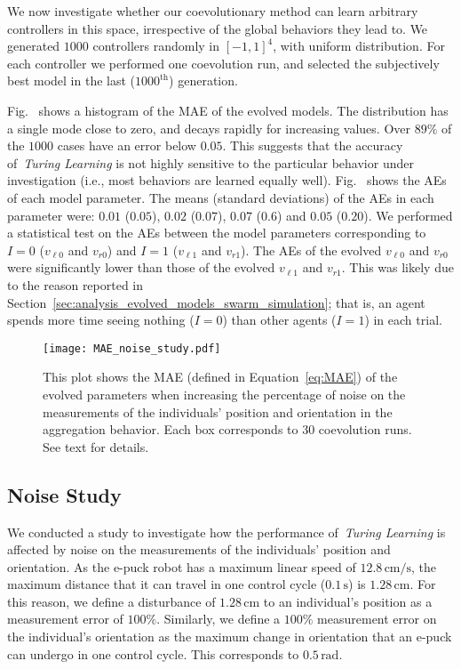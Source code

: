 We now investigate whether our coevolutionary method can learn arbitrary controllers in this space, irrespective of the global behaviors they lead to. We generated $1000$ controllers randomly in $[-1,1]^4$, with uniform distribution. For each controller we performed one coevolution run, and selected the subjectively best model in the last ($1000^\textrm{th}$) generation. 

Fig.~ shows a histogram of the MAE of the evolved models. The distribution has a single mode close to zero, and decays rapidly for increasing values. Over $89\%$ of the $1000$ cases have an error below $0.05$. This suggests that the accuracy of~\textit{Turing Learning} is not highly sensitive to the particular behavior under investigation (i.e., most behaviors are learned equally well). Fig.~ shows the AEs of each model parameter. The means (standard deviations) of the AEs in each parameter were: $0.01$ ($0.05$), $0.02$ ($0.07$), $0.07$ ($0.6$) and $0.05$ ($0.20$). We performed a statistical test on the AEs between the model parameters corresponding to $I=0$ ($v_{\ell0}$ and $v_{r0}$) and $I=1$ ($v_{\ell1}$ and $v_{r1}$). The AEs of the evolved $v_{\ell0}$ and  $v_{r0}$ were significantly lower than those of the evolved $v_{\ell1}$ and  $v_{r1}$. This was likely due to the reason reported in Section~\ref{sec:analysis_evolved_models_swarm_simulation}; that is, an agent spends more time seeing nothing ($I=0$) than other agents ($I=1$) in each trial.
\begin{figure}[!h]%
	\centering
	\texttt{[image: MAE\_noise\_study.pdf]}
	\caption{This plot shows the MAE (defined in Equation~\eqref{eq:MAE}) of the evolved parameters when increasing the percentage of noise on the measurements of the individuals' position and orientation in the aggregation behavior. Each box corresponds to 30 coevolution runs. See text for details.
\label{fig:noise_study}}
\end{figure}

\subsection{Noise Study}\label{sec:noise_study_swarm_simulation}

We conducted a study to investigate how the performance of~\textit{Turing Learning} is affected by noise on the measurements of the individuals' position and orientation. As the e-puck robot has a maximum linear speed of $12.8\,\textrm{cm/s}$, the maximum distance that it can travel in one control cycle ($0.1\,\textrm{s}$) is $1.28\,\textrm{cm}$. For this reason, we define a disturbance of $1.28\,\textrm{cm}$ to an individual's position as a measurement error of $100\%$. Similarly, we define a $100\%$ measurement error on the individual's orientation as the maximum change in orientation that an e-puck can undergo in one control cycle. This corresponds to $0.5\,\textrm{rad}$.


